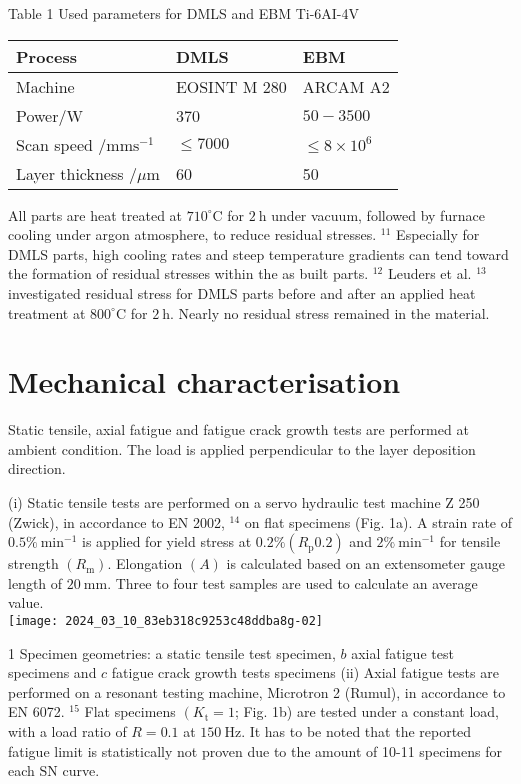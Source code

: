\documentclass[10pt]{article}
\begin{document}
Table 1 Used parameters for DMLS and EBM Ti-6AI-4V

\begin{center}
\begin{tabular}{lll}
\hline
Process & DMLS & EBM \\
\hline
Machine & EOSINT M 280 & ARCAM A2 \\
Power/W & 370 & $50-3500$ \\
Scan speed $/ \mathrm{mm} \mathrm{s}^{-1}$ & $\leqslant 7000$ & $\leqslant 8 \times 10^{6}$ \\
Layer thickness $/ \mu \mathrm{m}$ & 60 & 50 \\
\hline
\end{tabular}
\end{center}

All parts are heat treated at $710^{\circ} \mathrm{C}$ for $2 \mathrm{~h}$ under vacuum, followed by furnace cooling under argon atmosphere, to reduce residual stresses. ${ }^{11}$ Especially for DMLS parts, high cooling rates and steep temperature gradients can tend toward the formation of residual stresses within the as built parts. ${ }^{12}$ Leuders et al. ${ }^{13}$ investigated residual stress for DMLS parts before and after an applied heat treatment at $800^{\circ} \mathrm{C}$ for $2 \mathrm{~h}$. Nearly no residual stress remained in the material.

\section*{Mechanical characterisation}
Static tensile, axial fatigue and fatigue crack growth tests are performed at ambient condition. The load is applied perpendicular to the layer deposition direction.

(i) Static tensile tests are performed on a servo hydraulic test machine Z 250 (Zwick), in accordance to EN 2002, ${ }^{14}$ on flat specimens (Fig. 1a). A strain rate of $0.5 \% \mathrm{~min}^{-1}$ is applied for yield stress at $0.2 \%\left(R_{\mathrm{p}} 0.2\right)$ and $2 \% \mathrm{~min}^{-1}$ for tensile strength $\left(R_{\mathrm{m}}\right)$. Elongation $(A)$ is calculated based on an extensometer gauge length of $20 \mathrm{~mm}$. Three to four test samples are used to calculate an average value.\\
\texttt{[image: 2024\_03\_10\_83eb318c9253c48ddba8g-02]}

1 Specimen geometries: a static tensile test specimen, $b$ axial fatigue test specimens and $c$ fatigue crack growth tests specimens (ii) Axial fatigue tests are performed on a resonant testing machine, Microtron 2 (Rumul), in accordance to EN 6072. ${ }^{15}$ Flat specimens $\left(K_{\mathrm{t}}=1\right.$; Fig. 1b) are tested under a constant load, with a load ratio of $R=0.1$ at $150 \mathrm{~Hz}$. It has to be noted that the reported fatigue limit is statistically not proven due to the amount of 10-11 specimens for each $\mathrm{SN}$ curve.
\end{document}
